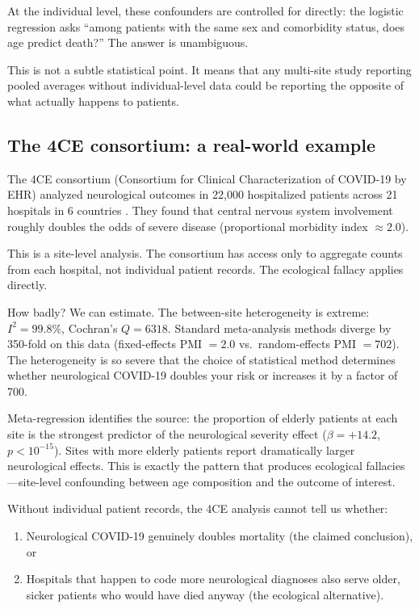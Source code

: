 \documentclass{article}
\begin{document}
At the individual level, these confounders are controlled for directly: the
logistic regression asks ``among patients with the same sex and comorbidity
status, does age predict death?''  The answer is unambiguous.

This is not a subtle statistical point.  It means that any multi-site study
reporting pooled averages without individual-level data could be reporting the
opposite of what actually happens to patients.


\subsection{The 4CE consortium: a real-world example}

The 4CE consortium (Consortium for Clinical Characterization of COVID-19 by
EHR) analyzed neurological outcomes in 22,000 hospitalized patients across 21
hospitals in 6 countries \cite{four_ce_neuro2021}.  They found that central
nervous system involvement roughly doubles the odds of severe disease
(proportional morbidity index $\approx 2.0$).

This is a site-level analysis.  The consortium has access only to aggregate
counts from each hospital, not individual patient records.  The ecological
fallacy applies directly.

How badly?  We can estimate.  The between-site heterogeneity is extreme:
$I^2 = 99.8\%$, Cochran's $Q = 6318$.  Standard meta-analysis methods diverge
by 350-fold on this data (fixed-effects PMI $= 2.0$ vs.\ random-effects PMI
$= 702$).  The heterogeneity is so severe that the choice of statistical
method determines whether neurological COVID-19 doubles your risk or increases
it by a factor of 700.

Meta-regression identifies the source: the proportion of elderly patients at
each site is the strongest predictor of the neurological severity effect
($\beta = +14.2$, $p < 10^{-15}$).  Sites with more elderly patients report
dramatically larger neurological effects.  This is exactly the pattern that
produces ecological fallacies---site-level confounding between age composition
and the outcome of interest.

Without individual patient records, the 4CE analysis cannot tell us whether:
\begin{enumerate}
\item Neurological COVID-19 genuinely doubles mortality (the claimed
conclusion), or
\item Hospitals that happen to code more neurological diagnoses also serve
older, sicker patients who would have died anyway (the ecological
alternative).
\end{enumerate}
\end{document}
